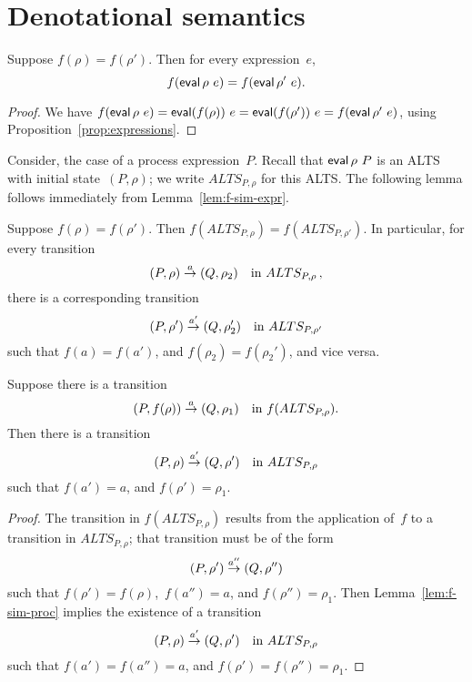 \section{Denotational semantics}

\begin{lemma}
\label{lem:f-sim-expr}
Suppose $f(\rho) = f(\rho')$.  Then for every expression~$e$,\,
\[
f(\mathop{\sf eval} \rho~e) =f(\mathop{\sf eval} \rho'~e).
\]
\end{lemma}
%
\begin{proof}
We have
\(
f(\mathop{\sf eval} \rho~e) = \mathop{\sf eval} (f(\rho))~e = \mathop{\sf eval} (f(\rho'))~e = f(\mathop{\sf eval} \rho'~e)
\),
using Proposition~\ref{prop:expressions}.
\end{proof}


Consider, the case of a process expression~$P$.  Recall that $\mathop{\sf eval} \rho~P$ is
an ALTS with initial state~$(P,\rho)$; we write $ALTS_{P,\rho}$ for this
ALTS\@.  The following lemma follows immediately from
Lemma~\ref{lem:f-sim-expr}.
%
\begin{lemma}
\label{lem:f-sim-proc}
Suppose $f(\rho) = f(\rho')$.  Then $f(ALTS_{P,\rho}) = f(ALTS_{P,\rho'})$.
In particular, for every transition 
\[
(P,\rho) \stackrel{a}{\rightarrow} (Q,\rho_2)  \quad \mbox{in $ALTS_{P,\rho}$}\,,
\]
there is a corresponding transition 
\[
(P,\rho') \stackrel{a'}{\rightarrow} (Q,\rho_2')  \quad \mbox{in $ALTS_{P,\rho'}$}
\]
such that $f(a) = f(a')$, and $f(\rho_2) = f(\rho_2')$, and vice versa.
\end{lemma}



\begin{lemma}
Suppose  there is a transition
\[
(P, f(\rho)) \stackrel{a}{\rightarrow} (Q,\rho_1)  \quad \mbox{in $f(ALTS_{P,\rho})$.}
\]
Then there is a transition 
\[
(P, \rho) \stackrel{a'}{\rightarrow} (Q, \rho') \quad \mbox{in $ALTS_{P,\rho}$}
\]
such that $f(a') = a$, and $f(\rho') = \rho_1$.
\end{lemma}

\begin{proof}
The transition in $f(ALTS_{P,\rho})$ results from the application of~$f$ to a
transition in $ALTS_{P,\rho}$; that transition must be of the form
\[
(P, \rho') \trans{a''} (Q, \rho'') %
\]
such that $f(\rho') = f(\rho)$,\, $f(a'') = a$, and $f(\rho'') = \rho_1$.
Then Lemma~\ref{lem:f-sim-proc} implies the existence of a transition
\[
(P, \rho) \stackrel{a'}{\rightarrow} (Q, \rho')  \quad \mbox{in $ALTS_{P,\rho}$}
\]
such that $f(a') = f(a'') = a$, and $f(\rho') = f(\rho'') = \rho_1$.
\end{proof}

